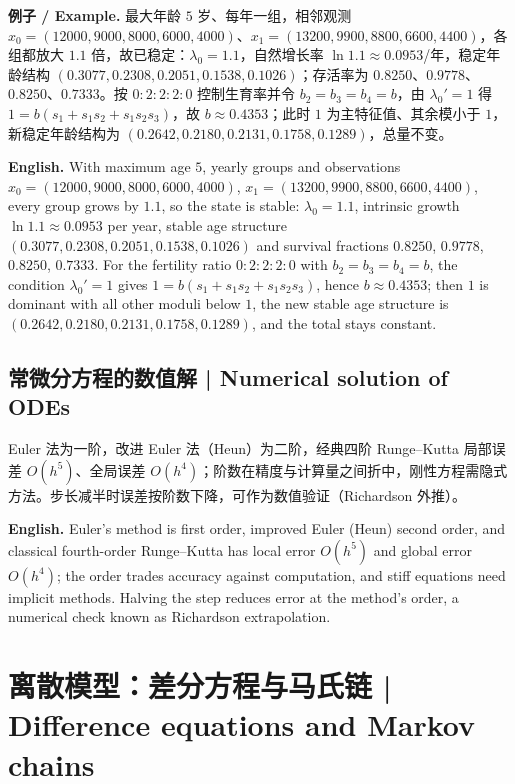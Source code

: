 \documentclass[UTF8,11pt,a4paper]{ctexart}
\newcommand{\EN}[1]{\par\noindent\textbf{English.} #1\par}
\newcommand{\EX}[2]{\par\noindent\textbf{例子 / Example.} #1\par\EN{#2}}
\begin{document}
\EX{最大年龄 $5$ 岁、每年一组，相邻观测 $x_0=(12000,9000,8000,6000,4000)$、$x_1=(13200,9900,8800,6600,4400)$，各组都放大 $1.1$ 倍，故已稳定：$\lambda_0=1.1$，自然增长率 $\ln1.1\approx0.0953$/年，稳定年龄结构 $(0.3077,0.2308,0.2051,0.1538,0.1026)$；存活率为 $0.8250$、$0.9778$、$0.8250$、$0.7333$。按 $0:2:2:2:0$ 控制生育率并令 $b_2=b_3=b_4=b$，由 $\lambda_0'=1$ 得 $1=b(s_1+s_1s_2+s_1s_2s_3)$，故 $b\approx0.4353$；此时 $1$ 为主特征值、其余模小于 $1$，新稳定年龄结构为 $(0.2642,0.2180,0.2131,0.1758,0.1289)$，总量不变。}{With maximum age $5$, yearly groups and observations $x_0=(12000,9000,8000,6000,4000)$, $x_1=(13200,9900,8800,6600,4400)$, every group grows by $1.1$, so the state is stable: $\lambda_0=1.1$, intrinsic growth $\ln1.1\approx0.0953$ per year, stable age structure $(0.3077,0.2308,0.2051,0.1538,0.1026)$ and survival fractions $0.8250$, $0.9778$, $0.8250$, $0.7333$. For the fertility ratio $0:2:2:2:0$ with $b_2=b_3=b_4=b$, the condition $\lambda_0'=1$ gives $1=b(s_1+s_1s_2+s_1s_2s_3)$, hence $b\approx0.4353$; then $1$ is dominant with all other moduli below $1$, the new stable age structure is $(0.2642,0.2180,0.2131,0.1758,0.1289)$, and the total stays constant.}

\subsection{常微分方程的数值解 | Numerical solution of ODEs}
Euler 法为一阶，改进 Euler 法（Heun）为二阶，经典四阶 Runge--Kutta 局部误差 $O(h^5)$、全局误差 $O(h^4)$；阶数在精度与计算量之间折中，刚性方程需隐式方法。步长减半时误差按阶数下降，可作为数值验证（Richardson 外推）。
\EN{Euler's method is first order, improved Euler (Heun) second order, and classical fourth-order Runge--Kutta has local error $O(h^5)$ and global error $O(h^4)$; the order trades accuracy against computation, and stiff equations need implicit methods. Halving the step reduces error at the method's order, a numerical check known as Richardson extrapolation.}


\section{离散模型：差分方程与马氏链 | Difference equations and Markov chains}
\end{document}
